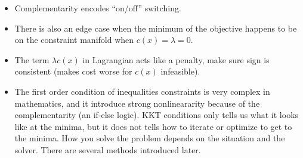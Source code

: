 \begin{itemize}
\begin{itemize}
        \item If constraint is ``inactive'' $\left(c(x) < 0\right)\Rightarrow\lambda=0$, same as unconstrained case.
    \end{itemize}
    \item Complementarity encodes ``on/off'' switching.
    \item There is also an edge case when the minimum of the objective happens to be on the constraint manifold when $c(x) = \lambda =0$.
    \item The term $\lambda c(x)$ in Lagrangian acts like a penalty, make sure sign is consistent (makes cost worse for $c(x)$ infeasible).
    \item The first order condition of inequalities constraints is very complex in mathematics, and it introduce strong nonlineararity because of the complementarity (an if-else logic). KKT conditions only tells us what it looks like at the minima, but it does not tells how to iterate or optimize to get to the minima. How you solve the problem depends on the situation and the solver. There are several methods introduced later.
\end{itemize}
